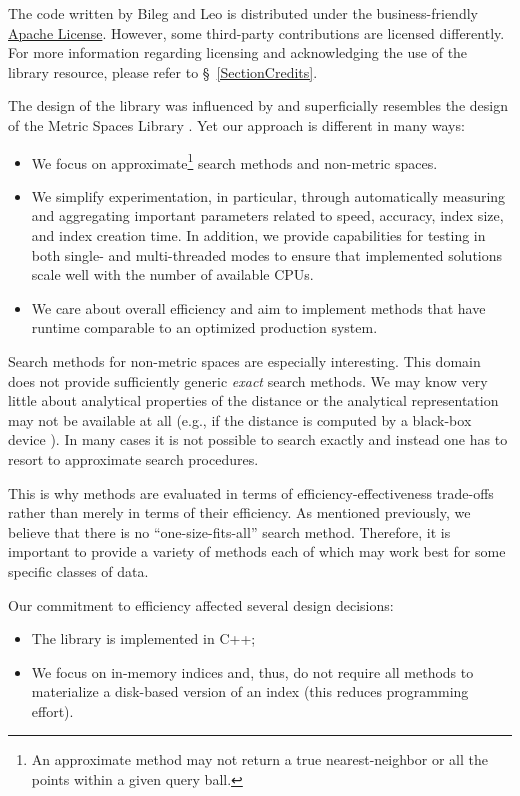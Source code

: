 \documentclass[runningheads,a4paper]{llncs}
\begin{document}
{The code written by Bileg and Leo is distributed under the business-friendly \href{http://apache.org/licenses/LICENSE-2.0}{Apache License}. 
However, some third-party contributions are licensed differently.
For more information regarding licensing and acknowledging the use of the library
resource, please refer to \S~\ref{SectionCredits}.

The design of the library was influenced by 
and superficially resembles the design of the Metric Spaces Library \cite{LibMetricSpace}.
Yet our approach is different in many ways:

\begin{itemize}
\item We focus on approximate\footnote{
An approximate method may not
return a true nearest-neighbor or
 all the points within a given query ball.}
  search methods and non-metric spaces.

\item We simplify experimentation, in particular, 
through automatically measuring and aggregating important parameters
related to speed, accuracy, index size, and index creation time. 
In addition, we provide capabilities for testing in both single- and multi-threaded modes
to ensure that implemented solutions scale well with the number of available CPUs.

\item We care about overall efficiency and
aim to implement methods that have runtime comparable to an optimized production system. 
\end{itemize}

Search methods for non-metric spaces are especially interesting.
This domain does not provide sufficiently generic \emph{exact} search methods.
We may know very little about analytical properties of the distance
or the analytical representation may not be available at all (e.g., if the 
distance is computed by a black-box device \cite{Skopal:2007}).
In many cases it is not possible to search exactly
and instead one has to resort to approximate search procedures.

This is why methods
are evaluated in terms of efficiency-effectiveness trade-offs
rather than merely in terms of their efficiency.
As mentioned previously, we believe that there is no ``one-size-fits-all'' search method.
Therefore, it is important to provide a variety of methods
each of which may work best for some specific classes of data.

Our commitment to efficiency affected several design decisions:
\begin{itemize}
\item The library is implemented in C++;
\item We focus on in-memory indices 
and, thus, do not require all methods to materialize a disk-based version of an index
(this reduces programming effort).


\end{itemize}}
\end{document}
